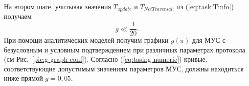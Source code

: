 

%

На втором шаге, учитывая значения $T_{update}$ и $T_{NetTraversal}$, из (\ref{eq:task:Tinfo}) получаем
\begin{equation}
  \label{eq:task:g-numeric}
g \ll \frac{1}{20}. %
\end{equation}
При помощи аналитических моделей получим графики $g (\pi)$  для  МУС с безусловным и условным подтверждением при различных параметрах протокола (см Рис.~\ref{pic:g-graph-conf}). Согласно (\ref{eq:task:g-numeric}) кривые, соответствующие допустимым значениям параметров МУС, должны находиться ниже прямой $g = 0,05$.

